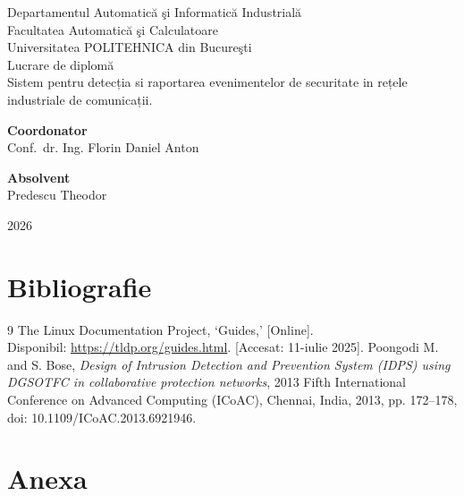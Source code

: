\documentclass[12pt,a4paper]{article}
\begin{document}
\begin{titlepage}
    \centering

    \vspace*{0.05\textheight}
    {\small Departamentul Automatică şi Informatică Industrială\\
        Facultatea Automatică şi Calculatoare\\
        Universitatea POLITEHNICA din Bucureşti}\\[3cm]

    {\Large Lucrare de diplomă}\\[0.5cm]
    {\LARGE Sistem pentru detecția si raportarea evenimentelor
    de securitate in rețele industriale de comunicații.}\\[3cm]

    \vfill
    \noindent
    \begin{minipage}{0.45\textwidth}
        \textbf{Coordonator}\\
        Conf.\ dr. Ing. Florin Daniel Anton
    \end{minipage}
    \hfill
    \begin{minipage}{0.30\textwidth}
        \textbf{Absolvent}\\
        Predescu Theodor
    \end{minipage}

    \vspace{3cm}
    2026
\end{titlepage}
\newpage

\tableofcontents
\newpage









\section{Bibliografie}
\begin{thebibliography}{9}
     The Linux Documentation Project, `Guides,'
    [Online].\\Disponibil: \url{https://tldp.org/guides.html}. [Accesat:
    11-iulie 2025].
     Poongodi M. and S. Bose, \textit{Design of Intrusion Detection and
        Prevention System (IDPS) using DGSOTFC in collaborative protection
        networks}, 2013 Fifth International Conference on Advanced Computing
    (ICoAC), Chennai, India, 2013, pp. 172--178, doi: 10.1109/ICoAC.2013.6921946.
\end{thebibliography}
\section{Anexa}
\end{document}
